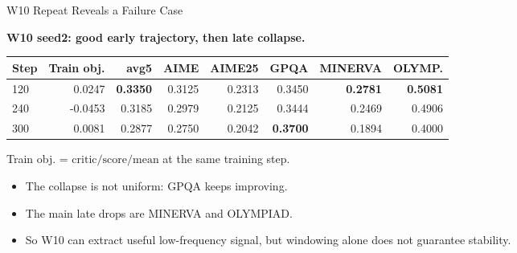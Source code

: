 \documentclass[aspectratio=169]{beamer}
\begin{document}
\begin{frame}{W10 Repeat Reveals a Failure Case}
\small

\textbf{W10 seed2: good early trajectory, then late collapse.}

\begin{center}
\scriptsize
\begin{tabular}{lrrrrrrr}
\toprule
Step & Train obj. & avg5 & AIME & AIME25 & GPQA & MINERVA & OLYMP. \\
\midrule
120 & 0.0247 & \textbf{0.3350} & 0.3125 & 0.2313 & 0.3450 & \textbf{0.2781} & \textbf{0.5081} \\
240 & -0.0453 & 0.3185 & 0.2979 & 0.2125 & 0.3444 & 0.2469 & 0.4906 \\
300 & 0.0081 & 0.2877 & 0.2750 & 0.2042 & \textbf{0.3700} & 0.1894 & 0.4000 \\
\bottomrule
\end{tabular}
\end{center}

\vspace{0.3em}

{\footnotesize\color{Muted}
Train obj. = \(\mathrm{critic/score/mean}\) at the same training step.
}

\vspace{0.4em}

\begin{itemize}
  \item The collapse is not uniform: GPQA keeps improving.
  \item The main late drops are MINERVA and OLYMPIAD.
  \item So W10 can extract useful low-frequency signal, but windowing alone does not guarantee stability.
\end{itemize}

\end{frame}
\end{document}

